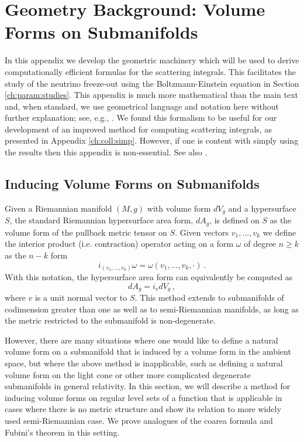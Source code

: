 \section{Geometry Background: Volume Forms on Submanifolds}\label{ch:vol:forms}
In this appendix we develop the geometric machinery which will be used to derive computationally efficient formulas for the scattering integrals. This facilitates the study  of the neutrino freeze-out using the Boltzmann-Einstein equation in Section \ref{ch:param:studies}.  This appendix is much more mathematical than the main text and, when standard, we use geometrical language and notation here without further explanation;  see, e.g., \cite{lee2003introduction,lee1997riemannian,o1983semi}.  We found this formalism to be useful for our development of an improved method for computing scattering integrals, as presented in Appendix \ref{ch:coll:simp}.  However, if one is content with simply using the results then this appendix is non-essential. See also   \cite{Birrell:2014uka}.



\subsection{Inducing Volume Forms on Submanifolds}

Given a Riemannian manifold $(M,g)$ with volume form $dV_g$ and a  hypersurface $S$, the standard Riemannian hypersurface area form, $dA_g$, is defined on $S$ as the volume form of the pullback metric tensor on $S$.   Given vectors $v_1,...,v_k$ we define the interior product (i.e. contraction)  operator acting on a form $\omega$ of degree $n\geq k$ as the $n-k$ form 
\begin{equation}
i_{(v_1,...,v_k)}\omega=\omega(v_1,...,v_k,\cdot)\,.
\end{equation}
 With this notation, the hypersurface area form can equivalently be computed as
\begin{equation}
dA_g=i_v dV_g\,,
\end{equation}
where $v$ is a unit normal vector to $S$.  This method extends to submanifolds of codimension greater than one as well as to semi-Riemannian manifolds, as long as the metric restricted to the submanifold is non-degenerate. 

However, there are many situations where one would like to define a natural volume form on a submanifold that is induced by a volume form in the ambient space, but where the above method is inapplicable, such as defining a natural volume form on the light cone or other more complicated degenerate submanifolds in general relativity. In this section, we will describe a method for inducing volume forms on regular level sets of a function that is applicable in cases where there is no metric structure and show its relation to more widely used semi-Riemannian case.  We prove analogues of the coarea formula and Fubini's theorem in this setting. 


